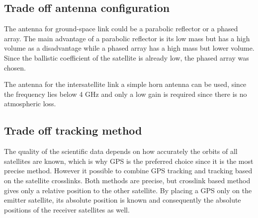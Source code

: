 \subsection{Trade off antenna configuration}
The antenna for ground-space link could be a parabolic reflector or a phased array. The main advantage of a parabolic reflector is its low mass but has a high volume as a disadvantage while a phased array has a high mass but lower volume. Since the ballistic coefficient of the satellite is already low, the phased array was chosen.

The antenna for the intersatellite link a simple horn antenna can be used, since the frequency lies below 4 GHz and only a low gain is required since there is no atmospheric loss.

\subsection{Trade off tracking method}
The quality of the scientific data depends on how accurately the orbits of all satellites are known, which is why GPS is the preferred choice since it is the most precise method. However it possible to combine GPS tracking and tracking based on the satellite crosslinks. Both methods are precise, but crosslink based method gives only a relative position to the other satellite. By placing a GPS only on the emitter satellite, its absolute position is known and consequently the absolute positions of the receiver satellites as well.
